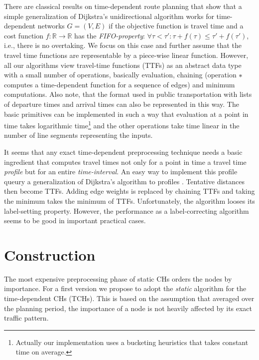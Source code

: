 \documentclass[12pt]{article}
\newcommand{\gilt}{:}
\newcommand{\real}{\mathbb{R}}
\newcommand{\frage}[1]{}
\begin{document}
There are classical results on time-dependent route planning
\cite{CH66}  that show that a simple generalization of Dijkstra's
unidirectional algorithm works for time-dependent networks $G=(V,E)$ if the
objective function is travel time and a cost function
$f:\real\rightarrow\real$ has the \emph{FIFO-property}:
$\forall \tau<\tau'\gilt \tau+f(\tau)\leq \tau'+f(\tau')$, i.e., there is no
overtaking. We focus on this case and further assume that the travel
time functions are representable by a piece-wise linear
function. However, all our algorithms view travel-time functions (TTFs) as an
abstract data type with a small number of operations, basically
evaluation, chaining (operation $\mathbf{*}$ computes a time-dependent function for a sequence of edges) and minimum computations. Also note, that the
format used in public transportation with lists of departure times and
arrival times can also be represented in this way.
The basic primitives can be implemented in such a way that evaluation
at a point in time takes logarithmic time\footnote{Actually our implementation uses a bucketing heuristics that takes constant time on average.} 
and the other operations take
time linear in the number of line segments representing the inputs.


It seems that any exact time-dependent preprocessing technique needs a
basic ingredient that computes travel times not only for a point in
time a travel time \emph{profile}
but for an entire \emph{time-interval}.  An easy way to implement
this profile queury a generalization of Dijkstra's algorithm to profiles \cite{KS93}.
Tentative distances then become TTFs. Adding edge weights is replaced
by chaining TTFs and taking the minimum takes the minimum of
TTFs. Unfortunately, the algorithm looses its label-setting
property. However, the performance as a label-correcting algorithm
seems to be good in important practical cases.\frage{refs to refinements?}
 


\section{Construction}\label{s:construction}

The most expensive preprocessing phase of static CHs orders the nodes by importance.
For a first version we propose to adopt the \emph{static} algorithm for
the time-dependent CHs (TCHs).
This is based on the assumption that averaged over the planning
period, the importance of a node is not heavily affected by its
exact traffic pattern. 
\end{document}

